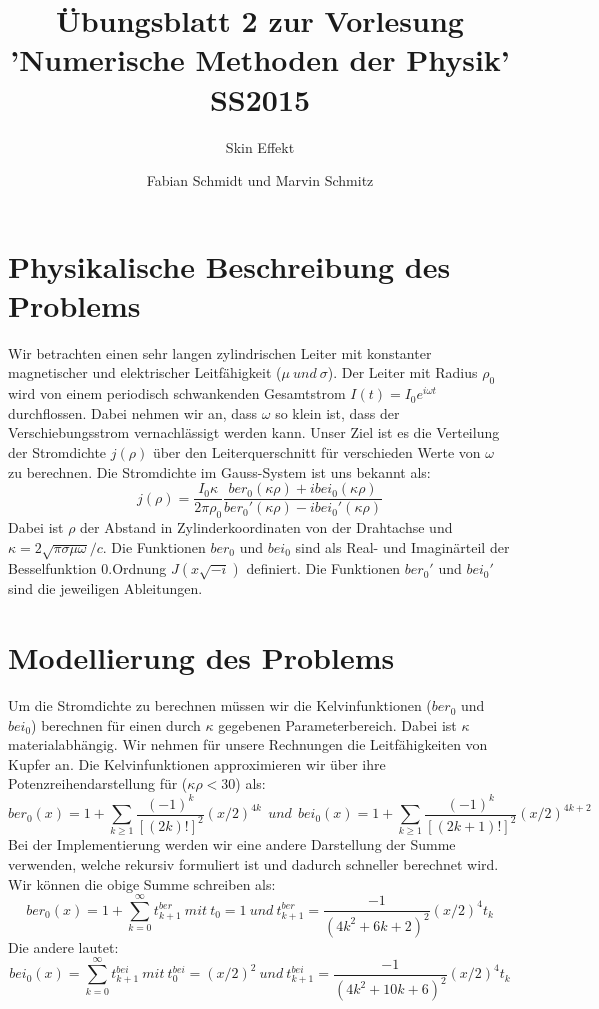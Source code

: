 \documentclass[ngerman]{scrartcl}
\begin{document}
\title{Übungsblatt 2 zur Vorlesung 'Numerische Methoden der Physik' SS2015}
\subtitle{Skin Effekt}
\author{Fabian Schmidt und Marvin Schmitz}
\maketitle

\newpage

\section*{Physikalische Beschreibung des Problems}

Wir betrachten einen sehr langen zylindrischen Leiter mit konstanter magnetischer und elektrischer Leitfähigkeit ($ \mu\ und\ \sigma $). Der Leiter mit Radius $\rho_0$ wird von einem periodisch schwankenden Gesamtstrom $I(t)=I_0 e^{i\omega t}$ durchflossen. Dabei nehmen wir an, dass $\omega$ so klein ist, dass der Verschiebungsstrom vernachlässigt werden kann. Unser Ziel ist es die Verteilung der Stromdichte $j(\rho)$ über den Leiterquerschnitt für verschieden Werte von $\omega$ zu berechnen.
Die Stromdichte im Gauss-System ist uns bekannt als:
\begin{equation*}
j(\rho)= \frac{I_0 \kappa}{2\pi \rho_0} \frac{ber_0(\kappa \rho)+ibei_0(\kappa \rho)}{ber_0'(\kappa \rho)-ibei_0'(\kappa \rho)}
\end{equation*}
Dabei ist $\rho$ der Abstand in Zylinderkoordinaten von der Drahtachse und $\kappa = 2\sqrt{\pi \sigma \mu \omega}/c$. Die Funktionen $ber_0$ und $bei_0$ sind als Real- und Imaginärteil der Besselfunktion 0.Ordnung $J(x\sqrt{-i})$ definiert. Die Funktionen $ber_0'$ und $bei_0'$ sind die jeweiligen Ableitungen.

\section*{Modellierung des Problems}

Um die Stromdichte zu berechnen müssen wir die Kelvinfunktionen ($ber_0$ und $bei_0$) berechnen für einen durch $\kappa$ gegebenen Parameterbereich. Dabei ist $\kappa$ materialabhängig. Wir nehmen für unsere Rechnungen die Leitfähigkeiten von Kupfer an. Die Kelvinfunktionen approximieren wir über ihre Potenzreihendarstellung für ($\kappa \rho<30$) als:
\begin{equation*}
ber_0(x) = 1+ \sum_{k\ge1} \frac{(-1)^k}{[(2k)!]^2}(x/2)^{4k} \ \ und\ \ bei_0(x) = 1+ \sum_{k\ge1} \frac{(-1)^k}{[(2k+1)!]^2}(x/2)^{4k+2}
\end{equation*}
Bei der Implementierung werden wir eine andere Darstellung der Summe verwenden, welche rekursiv formuliert ist und dadurch schneller berechnet wird.
Wir können die obige Summe schreiben als:
\begin{equation*}
ber_0(x) = 1+\sum_{k=0}^{\infty} t_{k+1}^{ber}\ mit\ t_0=1\ und\ t_{k+1}^{ber}=\frac{-1}{(4k^2+6k+2)^2}(x/2)^4 t_k
\end{equation*}
Die andere lautet:
\begin{equation*}
bei_0(x) = \sum_{k=0}^{\infty}t_{k+1}^{bei}\ mit\ t_0^{bei}= (x/2)^2\ und\ t_{k+1}^{bei}=\frac{-1}{(4k^2+10k+6)^2}(x/2)^4t_k 
\end{equation*}
\end{document}
